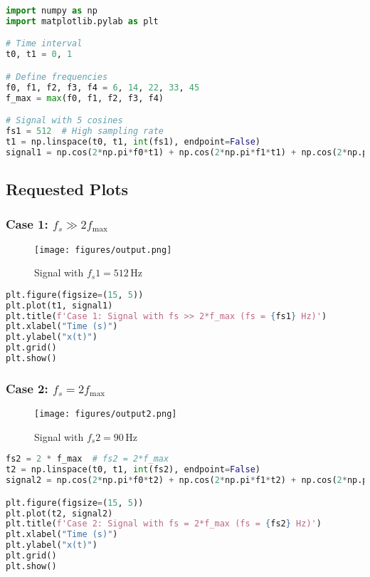 \documentclass[10pt]{article}
\theoremstyle{definition}
\theoremstyle{remark}
\theoremstyle{definition}
\numberwithin{equation}{prob}
\begin{document}
\begin{lstlisting}[language=Python, caption=Definition of the composite signal]
import numpy as np
import matplotlib.pylab as plt

# Time interval
t0, t1 = 0, 1

# Define frequencies
f0, f1, f2, f3, f4 = 6, 14, 22, 33, 45
f_max = max(f0, f1, f2, f3, f4)

# Signal with 5 cosines
fs1 = 512  # High sampling rate
t1 = np.linspace(t0, t1, int(fs1), endpoint=False)
signal1 = np.cos(2*np.pi*f0*t1) + np.cos(2*np.pi*f1*t1) + np.cos(2*np.pi*f2*t1) + np.cos(2*np.pi*f3*t1) + np.cos(2*np.pi*f4*t1)
\end{lstlisting}


\subsection{Requested Plots}

\subsubsection{Case 1: \( f_s \gg 2f_{\text{max}} \)}

\begin{figure}[H]
    \centering
    \texttt{[image: figures/output.png]}
    \caption{Signal with \( f_s1 = 512 \, \text{Hz} \)}
    \label{fig:case1}
\end{figure}

\begin{lstlisting}[language=Python, caption=Case 1 - High sampling rate]
plt.figure(figsize=(15, 5))
plt.plot(t1, signal1)
plt.title(f'Case 1: Signal with fs >> 2*f_max (fs = {fs1} Hz)')
plt.xlabel("Time (s)")
plt.ylabel("x(t)")
plt.grid()
plt.show()
\end{lstlisting}

\subsubsection{Case 2: \( f_s = 2f_{\text{max}} \)}

\begin{figure}[H]
    \centering
    \texttt{[image: figures/output2.png]}
    \caption{Signal with \( f_s2 = 90 \, \text{Hz} \)}
    \label{fig:case2}
\end{figure}

\begin{lstlisting}[language=Python, caption=Case 2 - Nyquist rate sampling]
fs2 = 2 * f_max  # fs2 = 2*f_max
t2 = np.linspace(t0, t1, int(fs2), endpoint=False)
signal2 = np.cos(2*np.pi*f0*t2) + np.cos(2*np.pi*f1*t2) + np.cos(2*np.pi*f2*t2) + np.cos(2*np.pi*f3*t2) + np.cos(2*np.pi*f4*t2)

plt.figure(figsize=(15, 5))
plt.plot(t2, signal2)
plt.title(f'Case 2: Signal with fs = 2*f_max (fs = {fs2} Hz)')
plt.xlabel("Time (s)")
plt.ylabel("x(t)")
plt.grid()
plt.show()
\end{lstlisting}
\end{document}
